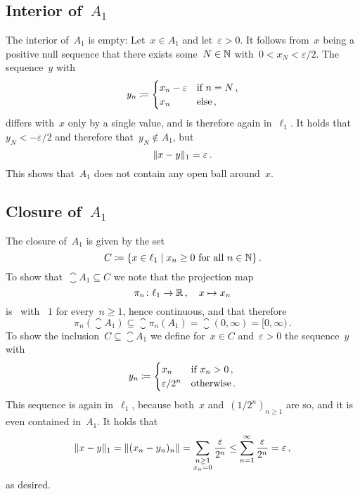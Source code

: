 \section{}





\subsection*{Interior of~$A_1$}

The interior of~$A_1$ is empty:
Let~$x \in A_1$ and let~$\varepsilon > 0$.
It follows from~$x$ being a positive null sequence that there exists some~$N \in \mathbb{N}$ with~$0 < x_N < \varepsilon/2$.
The sequence~$y$ with
\[
            y_n
  \coloneqq  \begin{cases}
              x_n - \varepsilon & \text{if~$n = N$} \,, \\
              x_n               & \text{else} \,, \\
            \end{cases}
\]
differs with~$x$ only by a single value, and is therefore again in~$\ell_1$.
It holds that~$y_N < -\varepsilon/2$ and therefore that~$y_N \notin A_1$, but
\[
    \lVert x - y\rVert_1
  = \varepsilon \,.
\]
This shows that~$A_1$ does not contain any open ball around~$x$.





\subsection*{Closure of~$A_1$}

The closure of~$A_1$ is given by the set
\[
            C
  \defined  \{
              x \in \ell_1
            \suchthat
              \text{$x_n \geq 0$ for all~$n \in \Natural$}
            \} \,.
\]
To show that~$\closure{A_1} \subseteq C$ we note that the projection map
\[
          \pi_n
  \colon  \ell_1
  \to     \mathbb{R} \,,
  \quad   x
  \mapsto x_n
\]
is~{\lipcont} with {\lipconst}~$1$ for every~$n \geq 1$, hence continuous, and that therefore
\[
            \pi_n(\closure{A_1})
  \subseteq \closure{ \pi_n(A_1) }
  =         \closure{ (0,\infty) }
  =         [0,\infty) \,.
\]
To show the inclusion~$C \subseteq \closure{A_1}$ we define for~$x \in C$ and~$\varepsilon > 0$ the sequence~$y$ with
\[
            y_n
  \coloneqq  \begin{cases}
              x_n             & \text{if~$x_n > 0$} \,,  \\
              \varepsilon/2^n & \text{otherwise} \,.
            \end{cases}
\]
This sequence is again in~$\ell_1$, because both~$x$ and~$(1/2^n)_{n \geq 1}$ are so, and it is even contained in~$A_1$.
It holds that
\[
        \lVert x - y \rVert_1
  =     \lVert (x_n - y_n)_n \rVert
  =     \sum_{\substack{n \geq 1 \\ x_n = 0}} \frac{\varepsilon}{2^n}
  \leq  \sum_{n=1}^\infty \frac{\varepsilon}{2^n}
  =     \varepsilon \,,
\]
as desired.





